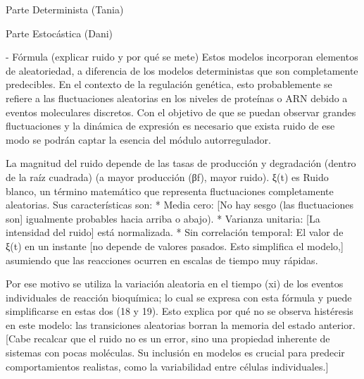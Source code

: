 Parte Determinista (Tania)


Parte Estocástica (Dani)

- Fórmula (explicar ruido y por qué se mete)
Estos modelos incorporan elementos de aleatoriedad, a diferencia de los modelos deterministas que son completamente predecibles. En el contexto de la regulación genética, esto probablemente se refiere a las fluctuaciones aleatorias en los niveles de proteínas o ARN debido a eventos moleculares discretos. 
Con el objetivo de que se puedan observar grandes fluctuaciones y la dinámica de expresión es necesario que exista ruido de ese modo se podrán captar la esencia del módulo autorregulador.

La magnitud del ruido depende de las tasas de producción y degradación (dentro de la raíz cuadrada) (a mayor producción (βf), mayor ruido).
ξ(t) es Ruido blanco, un término matemático que representa fluctuaciones completamente aleatorias. Sus características son: 
* Media cero: [No hay sesgo (las fluctuaciones son] igualmente probables hacia arriba o abajo). 
* Varianza unitaria: [La intensidad del ruido] está normalizada. 
* Sin correlación temporal: El valor de ξ(t) en un instante [no depende de valores pasados. Esto simplifica el modelo,] asumiendo que las reacciones ocurren en escalas de tiempo muy rápidas.

Por ese motivo se utiliza la variación aleatoria en el tiempo (xi) de los eventos individuales de reacción bioquímica; lo cual se expresa con esta fórmula y puede simplificarse en estas dos (18 y 19).
Esto explica por qué no se observa histéresis en este modelo: las transiciones aleatorias borran la memoria del estado anterior.
[Cabe recalcar que el ruido no es un error, sino una propiedad inherente de sistemas con pocas moléculas. Su inclusión en modelos es crucial para predecir comportamientos realistas, como la variabilidad entre células individuales.]

